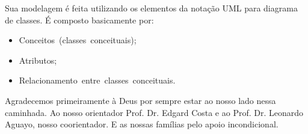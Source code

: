 Sua modelagem é feita utilizando os elementos da notação UML para diagrama de classes. É composto basicamente por:

\begin{itemize}
	\item Conceitos (classes conceituais);
	\item Atributos;
	\item Relacionamento entre classes conceituais.
\end{itemize}



Agradecemos primeiramente à Deus por sempre estar ao nosso lado nessa caminhada. Ao nosso orientador Prof. Dr. Edgard Costa e ao Prof. Dr. Leonardo Aguayo, nosso coorientador. E as nossas famílias pelo apoio incondicional. 